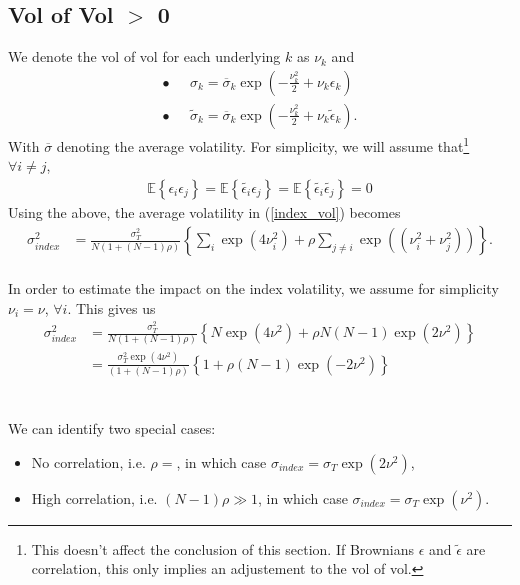 \documentclass[10pt]{article}
\begin{document}
\subsection{Vol of Vol $>$ 0}
We denote the vol of vol for each underlying $k$ as $\nu_k$ and 
\begin{align}
\bullet\ \ \ & \sigma_k = \overline{\sigma}_k\exp\left(-\frac{\nu_k^2}{2} + \nu_k\epsilon_k\right) \\
\bullet\ \ \ & \tilde{\sigma}_k = \overline{\sigma}_k\exp\left(-\frac{\nu_k^2}{2} + \nu_k\tilde{\epsilon}_k\right).
\end{align}
With $\overline{\sigma}$ denoting the average volatility. For simplicity, we will assume that\footnote{This doesn't affect the conclusion of this section. If Brownians $\epsilon$ and $\tilde{\epsilon}$ are correlation, this only implies an adjustement to the vol of vol.} $\forall i\neq j$,
\begin{align}
\mathbb{E}\left\{\epsilon_i\epsilon_j\right\} =\mathbb{E}\left\{\tilde{\epsilon_i}\epsilon_j\right\}=\mathbb{E}\left\{\tilde{\epsilon_i}\tilde{\epsilon_j}\right\} = 0
\end{align}
Using the above, the average volatility in (\ref{index_vol}) becomes
\begin{align}
\sigma^2_{index} &= \frac{\sigma^2_T}{N(1+(N-1)\rho)}\left\{\sum_{i}\exp\left(4\nu_i^2\right)+\rho\sum_{j\neq i}\exp\left((\nu_i^2+\nu_j^2)\right)\right\}.
\end{align}
\ \\
In order to estimate the impact on the index volatility, we assume for simplicity $\nu_i = \nu$, $\forall i$. This gives us
\begin{align}
\sigma^2_{index} &= \frac{\sigma^2_T}{N(1+(N-1)\rho)}\left\{N\exp\left(4\nu^2\right)+\rho N(N-1)\exp\left(2\nu^2\right)\right\}\\
&= \frac{\sigma^2_T\exp\left(4\nu^2\right)}{(1+(N-1)\rho)}\left\{1+\rho (N-1)\exp\left(-2\nu^2\right)\right\}
\end{align}
\ \\ \\
We can identify two special cases:
\begin{itemize}
\item No correlation, i.e. $\rho = $, in which case $\sigma_{index} = \sigma_T\exp\left(2\nu^2\right)$,
\item High correlation, i.e. $(N-1)\rho \gg 1$, in which case $\sigma_{index} = \sigma_T\exp\left(\nu^2\right)$.
\end{itemize}
\end{document}
